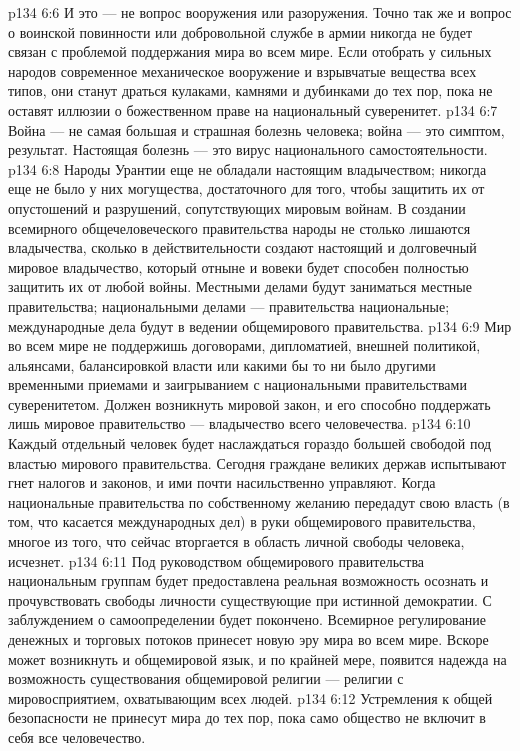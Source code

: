 \vs p134 6:6 И это --- не вопрос вооружения или разоружения. Точно так же и вопрос о воинской повинности или добровольной службе в армии никогда не будет связан с проблемой поддержания мира во всем мире. Если отобрать у сильных народов современное механическое вооружение и взрывчатые вещества всех типов, они станут драться кулаками, камнями и дубинками до тех пор, пока не оставят иллюзии о божественном праве на национальный суверенитет.
\vs p134 6:7 Война --- не самая большая и страшная болезнь человека; война --- это симптом, результат. Настоящая болезнь --- это вирус национального самостоятельности.
\vs p134 6:8 Народы Урантии еще не обладали настоящим владычеством; никогда еще не было у них могущества, достаточного для того, чтобы защитить их от опустошений и разрушений, сопутствующих мировым войнам. В создании всемирного общечеловеческого правительства народы не столько лишаются владычества, сколько в действительности создают настоящий и долговечный мировое владычество, который отныне и вовеки будет способен полностью защитить их от любой войны. Местными делами будут заниматься местные правительства; национальными делами --- правительства национальные; международные дела будут в ведении общемирового правительства.
\vs p134 6:9 Мир во всем мире не поддержишь договорами, дипломатией, внешней политикой, альянсами, балансировкой власти или какими бы то ни было другими временными приемами и заигрыванием с национальными правительствами суверенитетом. Должен возникнуть мировой закон, и его способно поддержать лишь мировое правительство --- владычество всего человечества.
\vs p134 6:10 Каждый отдельный человек будет наслаждаться гораздо большей свободой под властью мирового правительства. Сегодня граждане великих держав испытывают гнет налогов и законов, и ими почти насильственно управляют. Когда национальные правительства по собственному желанию передадут свою власть (в том, что касается международных дел) в руки общемирового правительства, многое из того, что сейчас вторгается в область личной свободы человека, исчезнет.
\vs p134 6:11 Под руководством общемирового правительства национальным группам будет предоставлена реальная возможность осознать и прочувствовать свободы личности существующие при истинной демократии. С заблуждением о самоопределении будет покончено. Всемирное регулирование денежных и торговых потоков принесет новую эру мира во всем мире. Вскоре может возникнуть и общемировой язык, и по крайней мере, появится надежда на возможность существования общемировой религии --- религии с мировосприятием, охватывающим всех людей.
\vs p134 6:12 Устремления к общей безопасности не принесут мира до тех пор, пока само общество не включит в себя все человечество.
